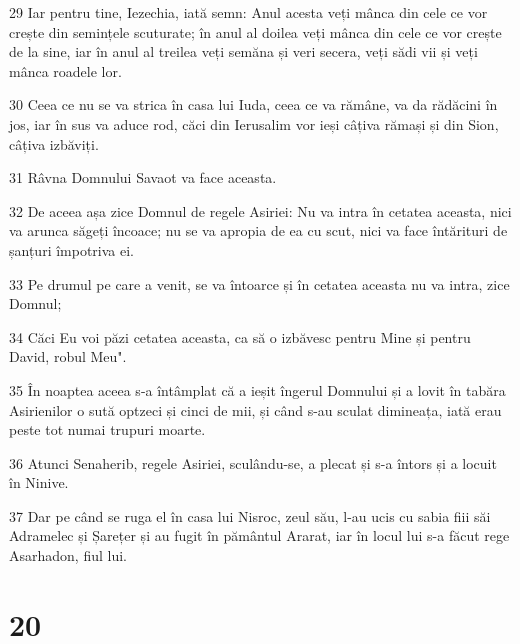 \par 29 Iar pentru tine, Iezechia, iată semn: Anul acesta veți mânca din cele ce vor crește din semințele scuturate; în anul al doilea veți mânca din cele ce vor crește de la sine, iar în anul al treilea veți semăna și veri secera, veți sădi vii și veți mânca roadele lor.
\par 30 Ceea ce nu se va strica în casa lui Iuda, ceea ce va  rămâne, va da rădăcini în jos, iar în sus va aduce rod, căci din Ierusalim vor ieși câțiva rămași și din Sion, câțiva izbăviți.
\par 31 Râvna Domnului Savaot va face aceasta.
\par 32 De aceea așa zice Domnul de regele Asiriei: Nu va intra în cetatea aceasta, nici va arunca săgeți încoace; nu se va apropia de ea cu scut, nici va face întărituri de șanțuri împotriva ei.
\par 33 Pe drumul pe care a venit, se va întoarce și în cetatea aceasta nu va intra, zice Domnul;
\par 34 Căci Eu voi păzi cetatea aceasta, ca să o izbăvesc pentru Mine și pentru David, robul Meu".
\par 35 În noaptea aceea s-a întâmplat că a ieșit îngerul Domnului și a lovit în tabăra Asirienilor o sută optzeci și cinci de mii, și când s-au sculat dimineața, iată erau peste tot numai trupuri moarte.
\par 36 Atunci Senaherib, regele Asiriei, sculându-se, a plecat și s-a întors și a locuit în Ninive.
\par 37 Dar pe când se ruga el în casa lui Nisroc, zeul său, l-au ucis cu sabia fiii săi Adramelec și Șarețer și au fugit în pământul Ararat, iar în locul lui s-a făcut rege Asarhadon, fiul lui.

\chapter{20}

